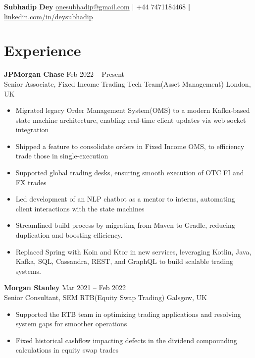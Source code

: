 \documentclass[a4paper,9pt]{article}  %
\begin{document}
\noindent
\textbf{\Large Subhadip Dey } \hfill  \href{mailto:onesubhadip@gmail.com}{ onesubhadip@gmail.com} \textbf{|} +44 7471184468 \textbf{|} \href{https://www.linkedin.com/in/deysubhadip/}{linkedin.com/in/deysubhadip} 



\section*{Experience}

\textbf{JPMorgan Chase} \hfill Feb 2022 -- Present \\
Senior Associate, Fixed Income Trading Tech Team(Asset Management) \hfill London, UK \vspace{-5pt}\\

\begin{itemize}[left=0pt, label=\textbullet, itemsep=0pt, parsep=0pt, topsep=0pt, partopsep=0pt]
    \item Migrated legacy Order Management System(OMS) to a modern Kafka-based state machine architecture, enabling real-time client updates via web socket integration
    \item Shipped a feature to consolidate orders in Fixed Income OMS, to efficiency trade those in single-execution
    \item Supported global trading desks, ensuring smooth execution of OTC FI and FX trades
    \item Led development of an NLP chatbot as a mentor to interns, automating client interactions with the state machines
    \item Streamlined build process by migrating from Maven to Gradle, reducing duplication and boosting efficiency.
    \item Replaced Spring with Koin and Ktor in new services, leveraging Kotlin, Java, Kafka, SQL, Cassandra, REST, and GraphQL to build scalable trading systems.
\end{itemize}
\vspace{8pt}

\textbf{Morgan Stanley} \hfill Mar 2021 -- Feb 2022 \\
Senior Consultant, SEM RTB(Equity Swap Trading) \hfill Galsgow, UK \vspace{-5pt}\\
\begin{itemize}[left=0pt, label=\textbullet, itemsep=0pt, parsep=0pt, topsep=0pt, partopsep=0pt]
    \item Supported the RTB team in optimizing trading applications and resolving system gaps for smoother operations
    \item Fixed historical cashflow impacting defects in the dividend compounding calculations in equity swap trades
\end{itemize}
\vspace{8pt}
\end{document}
